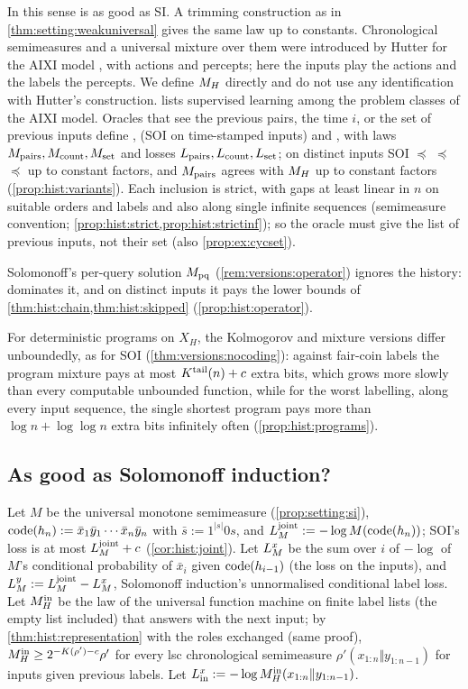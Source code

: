 In this sense \SFIhist{} is as good as SI. A trimming construction as in \cref{thm:setting:weakuniversal} gives the same law up to constants. Chronological semimeasures and a universal mixture over them were introduced by Hutter for the AIXI model \citep{hutter2000theory,hutter2005universal}, with actions and percepts; here the inputs play the actions and the labels the percepts. We define $M_{H}$ directly and do not use any identification with Hutter's construction. \citet{hutter2007aixi} lists supervised learning among the problem classes of the AIXI model. Oracles that see the previous pairs, the time $i$, or the set of previous inputs define \SFIpairs, \SFIcount{} (SOI on time-stamped inputs) and \SFIset, with laws $M_{\mathrm{pairs}},M_{\mathrm{count}},M_{\mathrm{set}}$ and losses $L_{\rm pairs},L_{\rm count},L_{\rm set}$; on distinct inputs SOI $\preceq$ \SFIcount{} $\preceq$ \SFIset{} $\preceq$ \SFIhist{} up to constant factors, and $M_{\mathrm{pairs}}$ agrees with $M_{H}$ up to constant factors (\cref{prop:hist:variants}). Each inclusion is strict, with gaps at least linear in $n$ on suitable orders and labels and also along single infinite sequences (semimeasure convention; \cref{prop:hist:strict,prop:hist:strictinf}); so the oracle must give the list of previous inputs, not their set (also \cref{prop:ex:cycset}).

Solomonoff's per-query solution $M_{\mathrm{pq}}$ (\cref{rem:versions:operator}) ignores the history: \SFIhist{} dominates it, and on distinct inputs it pays the lower bounds of \cref{thm:hist:chain,thm:hist:skipped} (\cref{prop:hist:operator}).

For deterministic programs on $X_H$, the Kolmogorov and mixture versions differ unboundedly, as for SOI (\cref{thm:versions:nocoding}): against fair-coin labels the program mixture pays at most $K^{\mathrm{tail}}(n)+c$ extra bits, which grows more slowly than every computable unbounded function, while for the worst labelling, along every input sequence, the single shortest program pays more than $\log n+\log\log n$ extra bits infinitely often (\cref{prop:hist:programs}).

\subsection{As good as Solomonoff induction?}\label{sec:hist:si}

Let $M$ be the universal monotone semimeasure (\cref{prop:setting:si}), $\operatorname{code}(h_n):=\bar x_1\bar y_1\cdots\bar x_n\bar y_n$ with $\bar s:=1^{|s|}0s$, and $L_{M}^{\mathrm{joint}}:=-\log M(\operatorname{code}(h_n))$; SOI's loss is at most $L_{M}^{\mathrm{joint}}+c$ (\cref{cor:hist:joint}). Let $L_{M}^{x}$ be the sum over $i$ of $-\log$ of $M$'s conditional probability of $\bar x_i$ given $\operatorname{code}(h_{i-1})$ (the loss on the inputs), and $L_{M}^{y}:=L_{M}^{\mathrm{joint}}-L_{M}^{x}$, Solomonoff induction's unnormalised conditional label loss. Let $M_{H}^{\mathrm{in}}$ be the law of the universal function machine on finite label lists (the empty list included) that answers with the next input; by \cref{thm:hist:representation} with the roles exchanged (same proof), $M_{H}^{\mathrm{in}}\ge2^{-K(\rho')-c}\rho'$ for every lsc chronological semimeasure $\rho'(x_{1:n}\Vert y_{1:n-1})$ for inputs given previous labels. Let $L^x_{\rm in}:=-\log M_{H}^{\mathrm{in}}(x_{1:n}\Vert y_{1:n-1})$.

